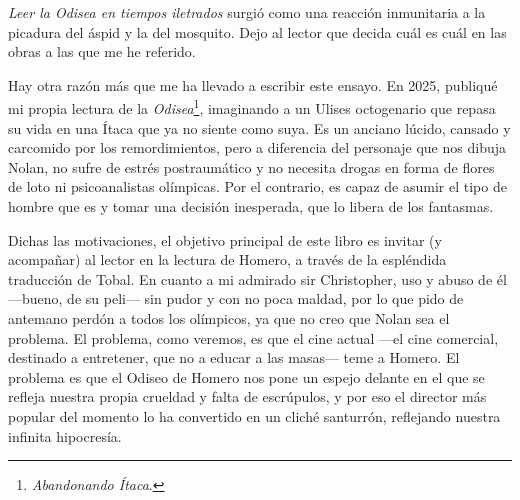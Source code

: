 \emph{Leer la Odisea en tiempos iletrados} surgió como una reacción inmunitaria a la picadura del áspid y la del mosquito. Dejo al lector que decida cuál es cuál en las obras a las que me he referido.

Hay otra razón más que me ha llevado a escribir este ensayo. En 2025, publiqué mi propia lectura de la \emph{Odisea}\footnote{\emph{Abandonando Ítaca}.}, imaginando a un Ulises octogenario que repasa su vida en una Ítaca que ya no siente como suya. Es un anciano lúcido, cansado y carcomido por los remordimientos, pero a diferencia del personaje que nos dibuja Nolan, no sufre de estrés postraumático y no necesita drogas en forma de flores de loto ni psicoanalistas olímpicas. Por el contrario, es capaz de asumir el tipo de hombre que es y tomar una decisión inesperada, que lo libera de los fantasmas.

Dichas las motivaciones, el objetivo principal de este libro es invitar (y acompañar) al lector en la lectura de Homero, a través de la espléndida traducción de Tobal. En cuanto a mi admirado sir Christopher, uso y abuso de él ---bueno, de su peli--- sin pudor y con no poca maldad, por lo que pido de antemano perdón a todos los olímpicos, ya que no creo que Nolan sea el problema. El problema, como veremos, es que el cine actual ---el cine comercial, destinado a entretener, que no a educar a las masas--- teme a Homero. El problema es que el Odiseo de Homero nos pone un espejo delante en el que se refleja nuestra propia crueldad y falta de escrúpulos, y por eso el director más popular del momento lo ha convertido en un cliché santurrón, reflejando nuestra infinita hipocresía.
